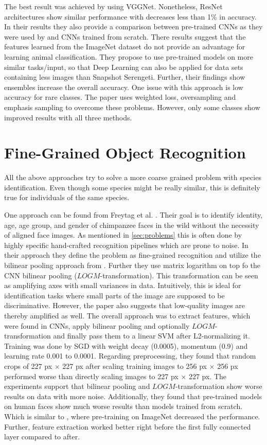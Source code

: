 \documentclass[electronic]{vgtc}             %
\begin{document}
	The best result was achieved by using VGGNet.
	Nonetheless, ResNet architectures show similar performance with decreases less than 1\% in accuracy.
	In their results they also provide a comparison between pre-trained CNNs as they were used by \cite{Gomez:2016} and CNNs trained from scratch.
	There results suggest that the features learned from the ImageNet dataset  do not provide an advantage for learning animal classification.
	They propose to use pre-trained models on more similar tasks/input, so that Deep Learning can also be applied for data sets containing less images than Snapshot Serengeti. 
	Further, their findings show ensembles increase the overall accuracy. 
	One issue with this approach is low accuracy for rare classes.
	The paper uses weighted loss, oversampling and emphasis sampling to overcome these problems. 
	However, only some classes show improved results with all three methods.
	
	\section{Fine-Grained Object Recognition}
	
	All the above approaches try to solve a more coarse grained problem with species identification. 
	Even though some species might be really similar, this is definitely true for individuals of the same species.
	
	One approach can be found from Freytag et al. \cite{Freytag:2014}. 
	Their goal is to identify identity, age, age group, and gender of chimpanzee faces in the wild without the necessity of aligned face images. 
	As mentioned in \autoref{sec:problems} this is often done by highly specific hand-crafted recognition pipelines which are prone to noise.
	In their approach they define the problem as fine-grained recognition and utilize the bilinear pooling approach from \cite{Lin:2015}.
	Further they use matrix logarithm on top fo the CNN bilinear pooling ($LOGM$-transformation).
	This transformation can be seen as amplifying axes with small variances in data.
	Intuitively, this is ideal for identification tasks where small parts of the image are supposed to be discriminative. 
	However, the paper also suggests that low-quality images are thereby amplified as well.
	The overall approach was to extract features, which were found in CNNs, apply bilinear pooling and optionally $LOGM$-transformation and finally pass them to a linear SVM after L2-normalizing it.
	Training was done by SGD with weight decay (0.0005), momentum (0.9) and learning rate 0.001 to 0.0001.
	Regarding preprocessing, they found that random crops of 227 px $\times$ 227 px
	after scaling training images to 256 px $\times$ 256 px performed worse than directly scaling images to 227 px $\times$ 227 px.
	The experiments support that bilinear pooling and $LOGM$-transformation show worse results on data with more noise.
	Additionally, they found that pre-trained models on human faces \cite{Parkhi:2015} show much worse results than models trained from scratch. 
	Which is similar to \cite{Norouzzadeh:2017, Norouzzadeh:2017:Count}, where pre-training on ImageNet decreased the performance. 
	Further, feature extraction worked better right before the first fully connected layer compared to after.
	
\end{document}
